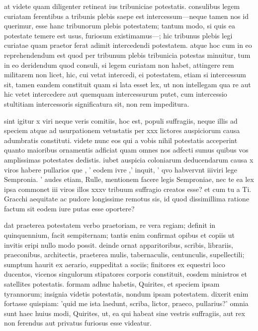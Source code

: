  at videte quam diligenter retineat ius tribuniciae potestatis. consulibus legem curiatam ferentibus a tribunis plebis saepe est intercessum—neque tamen nos id querimur, esse hanc tribunorum plebis potestatem; tantum modo, si quis ea potestate temere est usus, furiosum existimamus—; hic tribunus plebis legi curiatae quam praetor ferat adimit intercedendi potestatem. atque hoc cum in eo reprehendendum est quod per tribunum plebis tribunicia potestas minuitur, tum in eo deridendum quod consuli, si legem curiatam non habet, attingere rem militarem non licet, hic, cui vetat intercedi, ei potestatem, etiam si intercessum sit, tamen eandem constituit quam si lata esset lex, ut non intellegam qua re aut hic vetet intercedere aut quemquam intercessurum putet, cum intercessio stultitiam intercessoris significatura sit, non rem impeditura.

 sint igitur x viri neque veris comitiis, hoc est, populi suffragiis, neque illis ad speciem atque ad usurpationem vetustatis per xxx lictores auspiciorum causa adumbratis constituti. videte nunc eos qui a vobis nihil potestatis acceperint quanto maioribus ornamentis adficiat quam omnes nos adfecti sumus quibus vos amplissimas potestates dedistis. iubet auspicia coloniarum deducendarum causa x viros habere pullarios que , ' eodem ivre ,' inquit, ' qvo habvervnt iiiviri lege Sempronia. ' audes etiam, Rulle, mentionem facere legis Semproniae, nec te ea lex ipsa commonet iii viros illos xxxv tribuum suffragio creatos esse? et cum tu a Ti. Gracchi aequitate ac pudore longissime remotus sis, id quod dissimillima ratione factum sit eodem iure putas esse oportere?

 dat praeterea potestatem verbo praetoriam, re vera regiam; definit in quinquennium, facit sempiternam; tantis enim confirmat opibus et copiis ut invitis eripi nullo modo possit. deinde ornat apparitoribus, scribis, librariis, praeconibus, architectis, praeterea mulis, tabernaculis, centunculis, supellectili; sumptum haurit ex aerario, suppeditat a sociis; finitores ex equestri loco ducentos, vicenos singulorum stipatores corporis constituit, eosdem ministros et satellites potestatis. formam adhuc habetis, Quirites, et speciem ipsam tyrannorum; insignia videtis potestatis, nondum ipsam potestatem. dixerit enim fortasse quispiam: 'quid me ista laedunt, scriba, lictor, praeco, pullarius?' omnia sunt haec huius modi, Quirites, ut, ea qui habeat sine vestris suffragiis, aut rex non ferendus aut privatus furiosus esse videatur.

